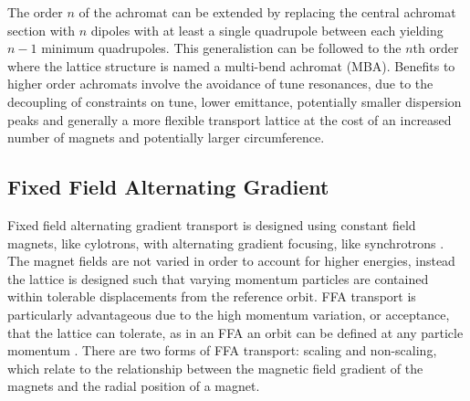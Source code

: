 \documentclass[../main.tex]{subfiles}
\begin{document}
The order $n$ of the achromat can be extended by replacing the central achromat section with $n$ dipoles with at least a single quadrupole between each yielding $n-1$ minimum quadrupoles. This generalistion can be followed to the $n$th order where the lattice structure is named a multi-bend achromat (MBA). Benefits to higher order achromats involve the avoidance of tune resonances, due to the decoupling of constraints on tune, lower emittance, potentially smaller dispersion peaks and generally a more flexible transport lattice \cite{jackson1986comparison} at the cost of an increased number of magnets and potentially larger circumference.  

\subsection{Fixed Field Alternating Gradient}
\label{sec:FFA}

Fixed field alternating gradient transport is designed using constant field magnets, like cylotrons, with alternating gradient focusing, like synchrotrons \cite{machida2013fixed}. The magnet fields are not varied in order to account for higher energies, instead the lattice is designed such that varying momentum particles are contained within tolerable displacements from the reference orbit. FFA transport is particularly advantageous due to the high momentum variation, or acceptance, that the lattice can tolerate, as in an FFA an orbit can be defined at any particle momentum \cite{barlow2010emma}. There are two forms of FFA transport: scaling and non-scaling, which relate to the relationship between the magnetic field gradient of the magnets and the radial position of a magnet.
\end{document}
